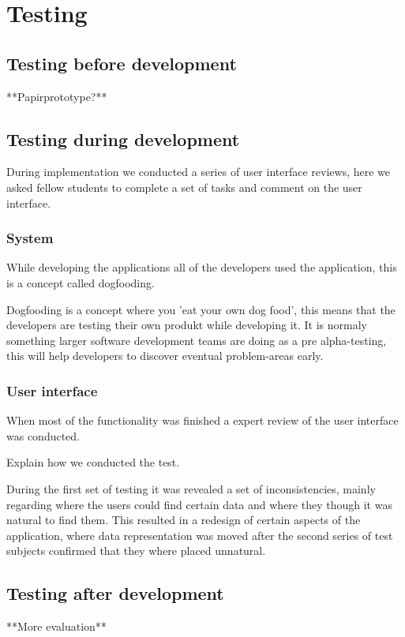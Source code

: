 \chapter{Testing}
\section{Testing before development}
**Papirprototype?**

\section{Testing during development}
During implementation we conducted a series of user interface reviews, here we asked fellow students to complete a set of tasks and comment on the user interface. 

\subsection{System}
While developing the applications all of the developers used the application, this is a concept called dogfooding.

Dogfooding is a concept where you 'eat your own dog food', this means that the developers are testing their own produkt while developing it. It is normaly something larger software development teams are doing as a pre alpha-testing, this will help developers to discover eventual problem-areas early.

\subsection{User interface}
When most of the functionality was finished a expert review of the user interface was conducted.

Explain how we conducted the test.

During the first set of testing it was revealed a set of inconsistencies, mainly regarding where the users could find certain data and where they though it was natural to find them. 
This resulted in a redesign of certain aspects of the application, where data representation was moved after the second series of test subjects confirmed that they where placed unnatural.

\section{Testing after development}
**More evaluation**